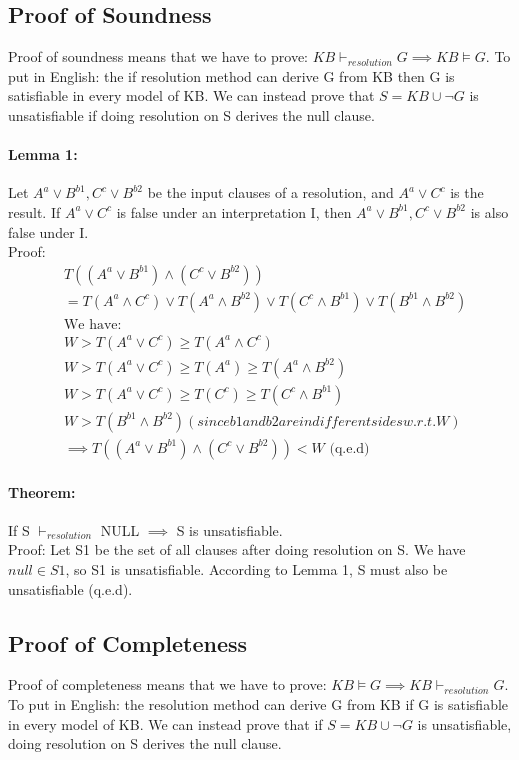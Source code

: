 \documentclass[26pt,fleqn,]{article}
\begin{document}
\subsection{Proof of Soundness}
Proof of soundness means that we have to prove: \(KB {\vdash}_{resolution} G \implies KB \models G\). To
put in English: the if resolution method can derive G from KB then G is satisfiable in every model of 
KB. We can instead prove that \(S = KB \cup \neg G\) is unsatisfiable if doing resolution on
S derives the null clause.\\

\paragraph{Lemma 1:} Let \(A^a \vee B^{b1}, C^c \vee B^{b2}\) be the input clauses of a resolution, and 
\(A^a \vee C^c\) is the result. If \(A^a \vee C^c\) is false under an interpretation I, then 
\(A^a \vee B^{b1}, C^c \vee B^{b2}\) is also false under I.\\
\indent Proof:
\begin{align*}
	&T((A^a \vee B^{b1}) \wedge (C^c \vee B^{b2}))\\
	&= T(A^a \wedge C^c) \vee T(A^a \wedge B^{b2}) \vee T(C^c \wedge B^{b1}) \vee T(B^{b1} \wedge 
	B^{b2})\\
	&\text{We have:}\\
	&W > T(A^a \vee C^c) \ge T(A^a \wedge C^c)\\
	&W > T(A^a \vee C^c) \ge T(A^a) \ge T(A^a \wedge B^{b2})\\
	&W > T(A^a \vee C^c) \ge T(C^c) \ge T(C^c \wedge B^{b1})\\
	&W > T(B^{b1} \wedge B^{b2}) (since b1 and b2 are in different sides w.r.t. W)\\
	&\implies T((A^a \vee B^{b1}) \wedge (C^c \vee B^{b2})) < W \text{ (q.e.d)}
\end{align*}

\paragraph{Theorem:} If S \(\vdash_{resolution}\) NULL \(\implies\) S is unsatisfiable.\\
\indent Proof: Let S1 be the set of all clauses after doing resolution on S. We have \(null \in S1\), so
S1 is unsatisfiable. According to Lemma 1, S must also be unsatisfiable (q.e.d).\\
\subsection{Proof of Completeness}
Proof of completeness means that we have to prove: \(KB \models G \implies KB {\vdash}_{resolution} G\). To put in English: the resolution method can derive G from KB if G is satisfiable in every model of 
KB. We can instead prove that if \(S = KB \cup \neg G\) is unsatisfiable,  doing resolution on
S derives the null clause.\\
\end{document}
